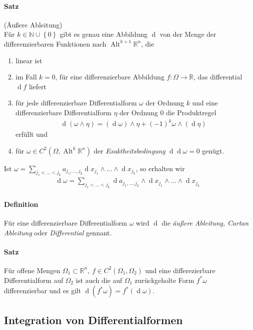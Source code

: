 \documentclass[12pt,a4paper,fleqn]{article}
\def\set#1{{\left\{ #1 \right\}}}
\def\R{{\mathbb{R}}}
\def\d{{\operatorname{d}}}
\begin{document}
\paragraph{Satz} (Äußere Ableitung)\\
Für $k\in \mathbb{N}\cup\set{0}$ gibt es genau eine Abbildung $\d$ von der Menge der differenzierbaren Funktionen nach $\operatorname{Alt}^{k+1} \R^n$, die
\begin{enumerate}
\item linear ist
\item im Fall $k=0$, für eine differenzierbare Abbildung $f\colon \Omega \rightarrow \R$, das differential $\d f$ liefert
\item für jede differenzierbare Differentialform $\omega$ der Ordnung $k$ und eine differenzierbare Differentialform $\eta$ der Ordnung $0$ die Produktregel
\begin{align*}
\d (\omega\wedge\eta) = (\d \omega) \wedge\eta + (-1)^k\omega\wedge(\d \eta)
\end{align*}
erfüllt und
\item für $\omega \in C^2(\Omega, \operatorname{Alt}^k \R^n)$ der \textit{Exaktheitsbedingung} $\d\d \omega = 0$ genügt.
\end{enumerate}
Ist $\omega = \sum_{j_1 <\dotsc < j_k} a_{j_1, \dotsc, j_k}\d x_{j_1}\wedge\dotsc\wedge\d x_{j_k}$, so erhalten wir 
\begin{align*}
\d\omega = \sum_{j_1 < \dotsc < j_k}\d a_{j_1, \dotsc, j_k} \wedge\d x_{j_1}\wedge\dotsc\wedge\d x_{j_k}
\end{align*}

\paragraph{Definition} Für eine differenzierbare Differentialform $\omega$ wird $\d$ die \textit{äußere Ableitung, Cartan Ableitung} oder \textit{Differential} gennant.

\paragraph{Satz} Für offene Mengen $\Omega_1\subset \R^n,\ f\in C^2(\Omega_1, \Omega_2)$ und eine differezierbare Differentialform auf $\Omega_2$ ist auch die auf $\Omega_1$ zurückgeholte Form $f^\ast\omega$ differenzierbar und es gilt $\d (f^\ast\omega)=f^\ast(\d \omega)$.

\subsection{Integration von Differentialformen}
\end{document}
